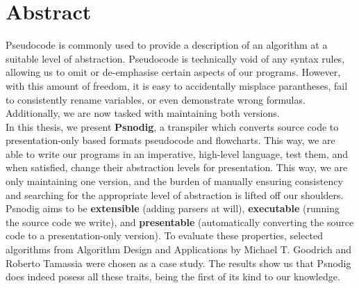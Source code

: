 \chapter*{Abstract}

Pseudocode is commonly used to provide a description of an algorithm at a suitable level of abstraction. Pseudocode is technically void of any syntax rules, allowing us to omit or de-emphasise certain aspects of our programs. However, with this amount of freedom, it is easy to accidentally misplace parantheses, fail to consistently rename variables, or even demonstrate wrong formulas. Additionally, we are now tasked with maintaining both versions. \\

In this thesis, we present \textbf{Psnodig}, a transpiler which converts source code to presentation-only based formats pseudocode and flowcharts. This way, we are able to write our programs in an imperative, high-level language, test them, and when satisfied, change their abstraction levels for presentation. This way, we are only maintaining one version, and the burden of manually ensuring consistency and searching for the appropriate level of abstraction is lifted off our shoulders. \\

Psnodig aims to be \textbf{extensible} (adding parsers at will), \textbf{executable} (running the source code we write), and \textbf{presentable} (automatically converting the source code to a presentation-only version). To evaluate these properties, selected algorithms from Algorithm Design and Applications by Michael T. Goodrich and Roberto Tamassia were chosen as a case study. The results show us that Psnodig does indeed posess all these traits, being the first of its kind to our knowledge.